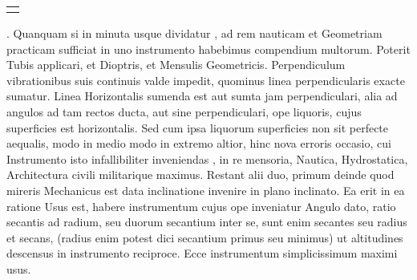 {\begin{tabular}{l}
\protect\end{tabular}}. Quanquam si in minuta usque  dividatur , ad rem nauticam et Geometriam practicam sufficiat in uno instrumento habebimus compendium multorum. Poterit Tubis applicari, et Dioptris, et Mensulis Geometricis. Perpendiculum vibrationibus suis continuis valde impedit, quominus linea perpendicularis exacte sumatur. Linea Horizontalis sumenda est aut sumta jam perpendiculari, alia ad angulos ad tam rectos ducta, aut sine perpendiculari, ope liquoris\protect{}, cujus superficies est horizontalis. Sed cum ipsa liquorum\protect{} superficies non sit perfecte aequalis,  modo in medio modo in extremo altior, hinc nova erroris occasio, cui Instrumento isto infallibiliter  inveniendas , in re mensoria,  Nautica, Hydrostatica, Architectura civili militarique maximus. Restant alii duo, primum  deinde quod mireris  Mechanicus est data inclinatione\protect{} invenire  in plano inclinato. Ea erit in ea ratione   Usus  est, habere instrumentum cujus ope inveniatur Angulo dato, ratio secantis ad radium, seu duorum secantium inter se, sunt enim secantes seu radius et secans, (radius enim potest dici secantium primus seu minimus) ut altitudines descensus in instrumento reciproce. Ecce instrumentum simplicissimum maximi usus.
\pend